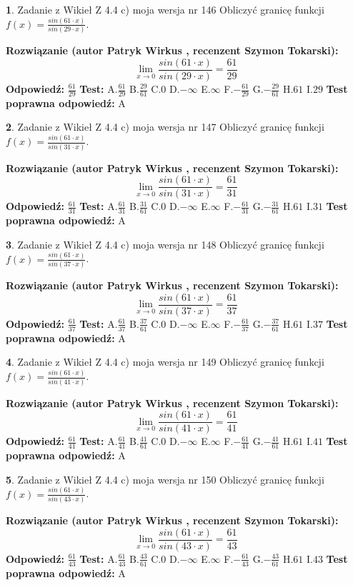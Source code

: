 \documentclass[12pt, a4paper]{article}
\theoremstyle{definition} %
\newtheorem{zad}{}
\newcommand{\zadStart}[1]{\begin{zad}#1\newline}
\newcommand{\zadStop}{\end{zad}}
\newcommand{\rozwStart}[2]{\noindent \textbf{Rozwiązanie (autor #1 , recenzent #2): }\newline}
\newcommand{\rozwStop}{\newline}
\newcommand{\odpStart}{\noindent \textbf{Odpowiedź:}\newline}
\newcommand{\odpStop}{\newline}
\newcommand{\testStart}{\noindent \textbf{Test:}\newline}
\newcommand{\testStop}{\newline}
\newcommand{\kluczStart}{\noindent \textbf{Test poprawna odpowiedź:}\newline}
\newcommand{\kluczStop}{\newline}
\begin{document}
\zadStart{Zadanie z Wikieł Z 4.4 c) moja wersja nr 146}
Obliczyć granicę funkcji $f(x)=\frac{sin(61\cdot x)}{sin(29\cdot x)}$.
\zadStop
\rozwStart{Patryk Wirkus}{Szymon Tokarski}
$$\lim\limits_{x\to 0}\frac{sin(61\cdot x)}{sin(29\cdot x)}=
\frac{61}{29}$$
\rozwStop
\odpStart
$\frac{61}{29}$
\odpStop
\testStart
A.$\frac{61}{29}$
B.$\frac{29}{61}$
C.$0$
D.$-\infty$
E.$\infty$
F.$-\frac{61}{29}$
G.$-\frac{29}{61}$
H.$61$
I.$29$
\testStop
\kluczStart
A
\kluczStop



\zadStart{Zadanie z Wikieł Z 4.4 c) moja wersja nr 147}
Obliczyć granicę funkcji $f(x)=\frac{sin(61\cdot x)}{sin(31\cdot x)}$.
\zadStop
\rozwStart{Patryk Wirkus}{Szymon Tokarski}
$$\lim\limits_{x\to 0}\frac{sin(61\cdot x)}{sin(31\cdot x)}=
\frac{61}{31}$$
\rozwStop
\odpStart
$\frac{61}{31}$
\odpStop
\testStart
A.$\frac{61}{31}$
B.$\frac{31}{61}$
C.$0$
D.$-\infty$
E.$\infty$
F.$-\frac{61}{31}$
G.$-\frac{31}{61}$
H.$61$
I.$31$
\testStop
\kluczStart
A
\kluczStop



\zadStart{Zadanie z Wikieł Z 4.4 c) moja wersja nr 148}
Obliczyć granicę funkcji $f(x)=\frac{sin(61\cdot x)}{sin(37\cdot x)}$.
\zadStop
\rozwStart{Patryk Wirkus}{Szymon Tokarski}
$$\lim\limits_{x\to 0}\frac{sin(61\cdot x)}{sin(37\cdot x)}=
\frac{61}{37}$$
\rozwStop
\odpStart
$\frac{61}{37}$
\odpStop
\testStart
A.$\frac{61}{37}$
B.$\frac{37}{61}$
C.$0$
D.$-\infty$
E.$\infty$
F.$-\frac{61}{37}$
G.$-\frac{37}{61}$
H.$61$
I.$37$
\testStop
\kluczStart
A
\kluczStop



\zadStart{Zadanie z Wikieł Z 4.4 c) moja wersja nr 149}
Obliczyć granicę funkcji $f(x)=\frac{sin(61\cdot x)}{sin(41\cdot x)}$.
\zadStop
\rozwStart{Patryk Wirkus}{Szymon Tokarski}
$$\lim\limits_{x\to 0}\frac{sin(61\cdot x)}{sin(41\cdot x)}=
\frac{61}{41}$$
\rozwStop
\odpStart
$\frac{61}{41}$
\odpStop
\testStart
A.$\frac{61}{41}$
B.$\frac{41}{61}$
C.$0$
D.$-\infty$
E.$\infty$
F.$-\frac{61}{41}$
G.$-\frac{41}{61}$
H.$61$
I.$41$
\testStop
\kluczStart
A
\kluczStop



\zadStart{Zadanie z Wikieł Z 4.4 c) moja wersja nr 150}
Obliczyć granicę funkcji $f(x)=\frac{sin(61\cdot x)}{sin(43\cdot x)}$.
\zadStop
\rozwStart{Patryk Wirkus}{Szymon Tokarski}
$$\lim\limits_{x\to 0}\frac{sin(61\cdot x)}{sin(43\cdot x)}=
\frac{61}{43}$$
\rozwStop
\odpStart
$\frac{61}{43}$
\odpStop
\testStart
A.$\frac{61}{43}$
B.$\frac{43}{61}$
C.$0$
D.$-\infty$
E.$\infty$
F.$-\frac{61}{43}$
G.$-\frac{43}{61}$
H.$61$
I.$43$
\testStop
\kluczStart
A
\kluczStop
\end{document}
